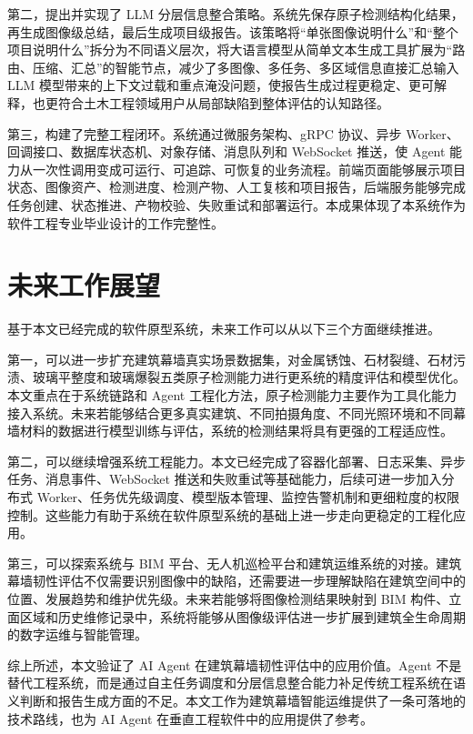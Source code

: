 第二，提出并实现了 LLM 分层信息整合策略。系统先保存原子检测结构化结果，再生成图像级总结，最后生成项目级报告。该策略将“单张图像说明什么”和“整个项目说明什么”拆分为不同语义层次，将大语言模型从简单文本生成工具扩展为“路由、压缩、汇总”的智能节点，减少了多图像、多任务、多区域信息直接汇总输入 LLM 模型带来的上下文过载和重点淹没问题，使报告生成过程更稳定、更可解释，也更符合土木工程领域用户从局部缺陷到整体评估的认知路径。

第三，构建了完整工程闭环。系统通过微服务架构、gRPC 协议、异步 Worker、回调接口、数据库状态机、对象存储、消息队列和 WebSocket 推送，使 Agent 能力从一次性调用变成可运行、可追踪、可恢复的业务流程。前端页面能够展示项目状态、图像资产、检测进度、检测产物、人工复核和项目报告，后端服务能够完成任务创建、状态推进、产物校验、失败重试和部署运行。本成果体现了本系统作为软件工程专业毕业设计的工作完整性。

\section{未来工作展望}
\label{sec:conclusion-future-work-outlook}

基于本文已经完成的软件原型系统，未来工作可以从以下三个方面继续推进。

第一，可以进一步扩充建筑幕墙真实场景数据集，对金属锈蚀、石材裂缝、石材污渍、玻璃平整度和玻璃爆裂五类原子检测能力进行更系统的精度评估和模型优化。本文重点在于系统链路和 Agent 工程化方法，原子检测能力主要作为工具化能力接入系统。未来若能够结合更多真实建筑、不同拍摄角度、不同光照环境和不同幕墙材料的数据进行模型训练与评估，系统的检测结果将具有更强的工程适应性。

第二，可以继续增强系统工程能力。本文已经完成了容器化部署、日志采集、异步任务、消息事件、WebSocket 推送和失败重试等基础能力，后续可进一步加入分布式 Worker、任务优先级调度、模型版本管理、监控告警机制和更细粒度的权限控制。这些能力有助于系统在软件原型系统的基础上进一步走向更稳定的工程化应用。

第三，可以探索系统与 BIM 平台、无人机巡检平台和建筑运维系统的对接。建筑幕墙韧性评估不仅需要识别图像中的缺陷，还需要进一步理解缺陷在建筑空间中的位置、发展趋势和维护优先级。未来若能够将图像检测结果映射到 BIM 构件、立面区域和历史维修记录中，系统将能够从图像级评估进一步扩展到建筑全生命周期的数字运维与智能管理。

综上所述，本文验证了 AI Agent 在建筑幕墙韧性评估中的应用价值。Agent 不是替代工程系统，而是通过自主任务调度和分层信息整合能力补足传统工程系统在语义判断和报告生成方面的不足。本文工作为建筑幕墙智能运维提供了一条可落地的技术路线，也为 AI Agent 在垂直工程软件中的应用提供了参考。
